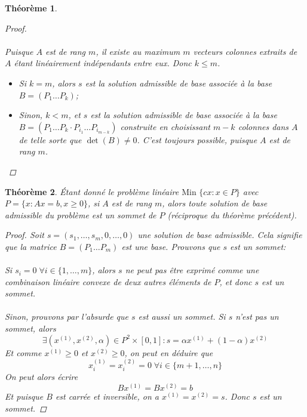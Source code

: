 \documentclass[a4paper]{report}
\theoremstyle{definition}
\theoremstyle{remark}
\theoremstyle{plain}
\newtheorem{theorem}{Théorème}
\begin{document}
\begin{theorem}
\begin{proof}
\paragraph{}
Puisque \(A\) est de rang \(m\), il existe au maximum \(m\) vecteurs colonnes
extraits de \(A\) étant linéairement indépendants entre eux. Donc \(k\le m\).
\begin{itemize}
	\item Si \(k=m\), alors \(s\) est la solution admissible de base associée à
	la base \(B=(P_1\dots P_k)\);
	\item Sinon, \(k<m\), et \(s\) est la solution admissible de base associée à
	la base \(B=(P_1\dots P_k\cdot P_{i_1}\dots P_{i_{m-k}})\)
	construite en choisissant \(m-k\) colonnes dans \(A\) de telle sorte que
	\(\det(B)\neq 0\). C'est toujours possible, puisque \(A\) est de rang \(m\).
\end{itemize}
\end{proof}
\end{theorem}

\begin{theorem}
Étant donné le problème linéaire \(\text{Min }\{cx:x\in P\}\) avec
\(P = \{x:Ax=b,x\ge 0\}\), si \(A\) est de rang \(m\), alors toute solution de
base admissible du problème est un sommet de \(P\) (réciproque du théorème
précédent).
\begin{proof}
Soit \(s=(s_1,\dots,s_m,0,\dots,0)\) une solution de base admissible. Cela
signifie que la matrice \(B=(P_1\dots P_m)\) est une base. Prouvons que \(s\)
est un sommet:
\paragraph{}
Si \(s_i=0\;\forall i\in\{1,\dots,m\}\), alors \(s\) ne peut pas être exprimé
comme une combinaison linéaire convexe de deux autres éléments de \(P\), et donc
\(s\) est un sommet.
\paragraph{}
Sinon, prouvons par l'absurde que \(s\) est aussi un sommet. Si \(s\) n'est pas
un sommet, alors
\[\exists (x^{(1)},x^{(2)},\alpha)\in P^2\times[0,1]:s=\alpha x^{(1)}+(1-\alpha)x^{(2)}\]
Et comme \(x^{(1)}\ge0\) et \(x^{(2)}\ge0\), on peut en déduire que
\[x^{(1)}_i=x^{(2)}_i=0\;\forall i\in\{m+1,\dots,n\}\]
On peut alors écrire
\[Bx^{(1)}=Bx^{(2)}=b\]
Et puisque \(B\) est carrée et inversible, on a \(x^{(1)}=x^{(2)}=s\).
Donc \(s\) est un sommet.
\end{proof}
\end{theorem}
\end{document}
